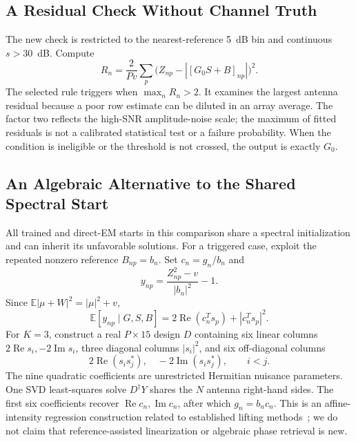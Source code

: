 \subsection{A Residual Check Without Channel Truth}
The new check is restricted to the nearest-reference 5~dB bin and continuous $s>30$~dB. Compute
\begin{equation}
 R_n=\frac{2}{Pv}\sum_p\bigl(Z_{np}-|[G_0S+B]_{np}|\bigr)^2.
 \label{eq:gate}
\end{equation}
The selected rule triggers when $\max_nR_n>2$. It examines the largest antenna residual because a poor row estimate can be diluted in an array average. The factor two reflects the high-SNR amplitude-noise scale; the maximum of fitted residuals is not a calibrated statistical test or a failure probability. When the condition is ineligible or the threshold is not crossed, the output is exactly $G_0$.

\subsection{An Algebraic Alternative to the Shared Spectral Start}
All trained and direct-EM starts in this comparison share a spectral initialization and can inherit its unfavorable solutions. For a triggered case, exploit the repeated nonzero reference $B_{np}=b_n$. Set $c_n=g_n/b_n$ and
\begin{equation}
 y_{np}=\frac{Z_{np}^2-v}{|b_n|^2}-1.
\end{equation}
Since $\mathbb E|\mu+W|^2=|\mu|^2+v$,
\begin{equation}
 \mathbb E[y_{np}\mid G,S,B]
 =2\operatorname{Re}(c_n^Ts_p)+|c_n^Ts_p|^2.
 \label{eq:intensity}
\end{equation}
For $K=3$, construct a real $P\times15$ design $D$ containing six linear columns $2\operatorname{Re}s_i,-2\operatorname{Im}s_i$, three diagonal columns $|s_i|^2$, and six off-diagonal columns
\begin{equation}
 2\operatorname{Re}(s_i s_j^*),\quad
 -2\operatorname{Im}(s_i s_j^*),\qquad i<j.
\end{equation}
The nine quadratic coefficients are unrestricted Hermitian nuisance parameters. One SVD least-squares solve $D^\dagger Y$ shares the $N$ antenna right-hand sides. The first six coefficients recover $\operatorname{Re}c_n,\operatorname{Im}c_n$, after which $g_n=b_nc_n$. This is an affine-intensity regression construction related to established lifting methods~\cite{gao2018,candes2013phaselift,li2020affinelift}; we do not claim that reference-assisted linearization or algebraic phase retrieval is new.

